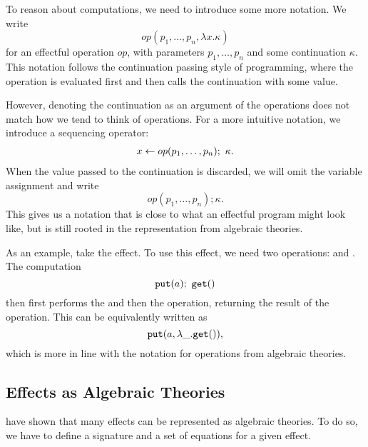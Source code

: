 To reason about computations, we need to introduce some more notation. We write
\[ op(p_1, \dots, p_n, \lambda x. \kappa) \]
for an effectful operation $op$, with parameters $p_1,\dots,p_n$ and some continuation $\kappa$. This notation follows the continuation passing style of programming, where the operation is evaluated first and then calls the continuation with some value.

However, denoting the continuation as an argument of the operations does not match how we tend to think of operations. For a more intuitive notation, we introduce a sequencing operator:
\begin{align*}
    x \gets op(p_1,\dots,p_n);\  \kappa.
\end{align*}
When the value passed to the continuation is discarded, we will omit the variable assignment and write 
\[ op(p_1,\dots,p_n); \kappa. \]
This gives us a notation that is close to what an effectful program might look like, but is still rooted in the representation from algebraic theories.

As an example, take the  effect. To use this effect, we need two operations: \oput and \oget. The computation
\[ \mathtt{put}(a);\  \mathtt{get}() \]
then first performs the \oput and then the \oget operation, returning the result of the \oget operation. This can be equivalently written as
\[ \mathtt{put}(a, \lambda \_. \mathtt{get}()), \]
which is more in line with the notation for operations from algebraic theories.

\subsection{Effects as Algebraic Theories}

\textcite{goos_adequacy_2001} have shown that many effects can be represented as algebraic theories. To do so, we have to define a signature and a set of equations for a given effect.

